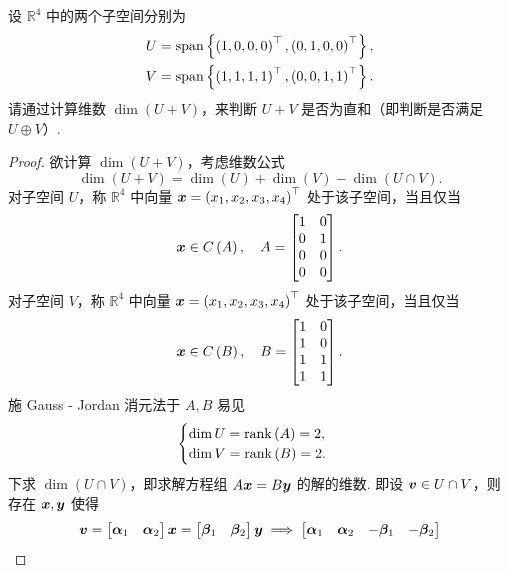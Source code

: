 设 $\mathbb{R}^4$ 中的两个子空间分别为
\[
\begin{aligned}
    U &= \mathrm{span}\left\{
    \left(1, 0, 0, 0\right)^\top,
    \left(0, 1, 0, 0\right)^\top
    \right\}, \\
    V &= \mathrm{span}\left\{
    \left(1, 1, 1, 1\right)^\top,
    \left(0, 0, 1, 1\right)^\top
    \right\}.
\end{aligned}
\]
请通过计算维数 $\dim \left(U + V\right)$，来判断 $U + V$ 是否为直和（即判断是否满足 $U \oplus V$）.

\begin{proof}
欲计算 $\dim \left(U + V\right)$，考虑维数公式
\[
\dim \left(U + V\right) = \dim \left(U\right) + \dim \left(V\right) - \dim \left(U \cap V\right).
\]
对子空间 $U$，称 $\mathbb{R}^4$ 中向量 $\boldsymbol{x} = \left(x_1, x_2, x_3, x_4\right)^\top$ 处于该子空间，当且仅当
\[
\boldsymbol{x} \in C \left(A\right), \quad A = \begin{bmatrix}
    1 & 0 \\
    0 & 1 \\
    0 & 0 \\
    0 & 0 \\
\end{bmatrix}.
\]
对子空间 $V$，称 $\mathbb{R}^4$ 中向量 $\boldsymbol{x} = \left(x_1, x_2, x_3, x_4\right)^\top$ 处于该子空间，当且仅当
\[
\boldsymbol{x} \in C \left(B\right), \quad B = \begin{bmatrix}
    1 & 0 \\
    1 & 0 \\
    1 & 1 \\
    1 & 1 \\
\end{bmatrix}.
\]
施 Gauss - Jordan 消元法于 $A, B$ 易见
\[
\begin{cases}
    \dim U = \mathrm{rank} \left(A\right) = 2, \\
    \dim V = \mathrm{rank} \left(B\right) = 2. \\
\end{cases}
\]
下求 $\dim \left(U \cap V\right)$，即求解方程组 $A \boldsymbol{x} = B \boldsymbol{y}$ 的解的维数. 即设 $\boldsymbol{v} \in U \cap V$，则存在 $\boldsymbol{x}, \boldsymbol{y}$ 使得
\[
\boldsymbol{v} = \begin{bmatrix}
    \boldsymbol{\alpha}_1 & \boldsymbol{\alpha}_2
\end{bmatrix} \boldsymbol{x} = \begin{bmatrix}
    \boldsymbol{\beta}_1 & \boldsymbol{\beta}_2
\end{bmatrix} \boldsymbol{y} \implies \begin{bmatrix}
    \boldsymbol{\alpha}_1 & \boldsymbol{\alpha}_2 & -\boldsymbol{\beta}_1 & -\boldsymbol{\beta}_2

\end{bmatrix}\]
\end{proof}
